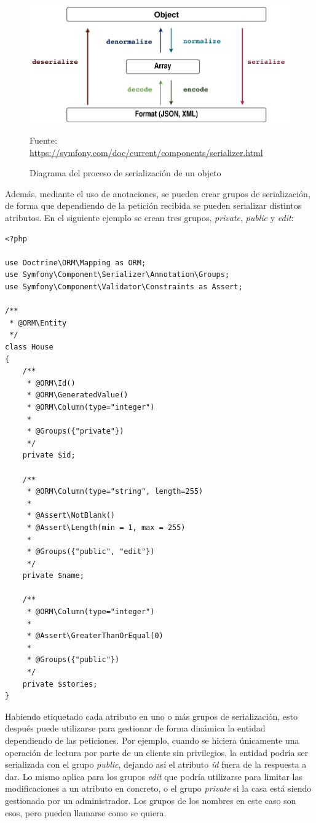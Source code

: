 \begin{figure}[h]
    \center
    \includegraphics[scale=0.3]{img/serializer_workflow}
    \caption{Diagrama del proceso de serialización de un objeto}
    Fuente: \url{https://symfony.com/doc/current/components/serializer.html}
\end{figure}

Además, mediante el uso de anotaciones, se pueden crear grupos de
serialización, de forma que dependiendo de la petición recibida se pueden
serializar distintos atributos. En el siguiente ejemplo se crean tres grupos,
\textit{private}, \textit{public} y \textit{edit}:

\begin{verbatim}
<?php

use Doctrine\ORM\Mapping as ORM;
use Symfony\Component\Serializer\Annotation\Groups;
use Symfony\Component\Validator\Constraints as Assert;

/**
 * @ORM\Entity
 */
class House
{
    /**
     * @ORM\Id()
     * @ORM\GeneratedValue()
     * @ORM\Column(type="integer")
     *
     * @Groups({"private"})
     */
    private $id;

    /**
     * @ORM\Column(type="string", length=255)
     *
     * @Assert\NotBlank()
     * @Assert\Length(min = 1, max = 255)
     *
     * @Groups({"public", "edit"})
     */
    private $name;

    /**
     * @ORM\Column(type="integer")
     *
     * @Assert\GreaterThanOrEqual(0)
     *
     * @Groups({"public"})
     */
    private $stories;
}
\end{verbatim}

Habiendo etiquetado cada atributo en uno o más grupos de serialización, esto
después puede utilizarse para gestionar de forma dinámica la entidad
dependiendo de las peticiones. Por ejemplo, cuando se hiciera únicamente una
operación de lectura por parte de un cliente sin privilegios, la entidad podría
ser serializada con el grupo \textit{public}, dejando así el atributo
\textit{id} fuera de la respuesta a dar. Lo mismo aplica para los grupos
\textit{edit} que podría utilizarse para limitar las modificaciones a un
atributo en concreto, o el grupo \textit{private} si la casa está siendo
gestionada por un administrador. Los grupos de los nombres en este caso son
esos, pero pueden llamarse como se quiera.

